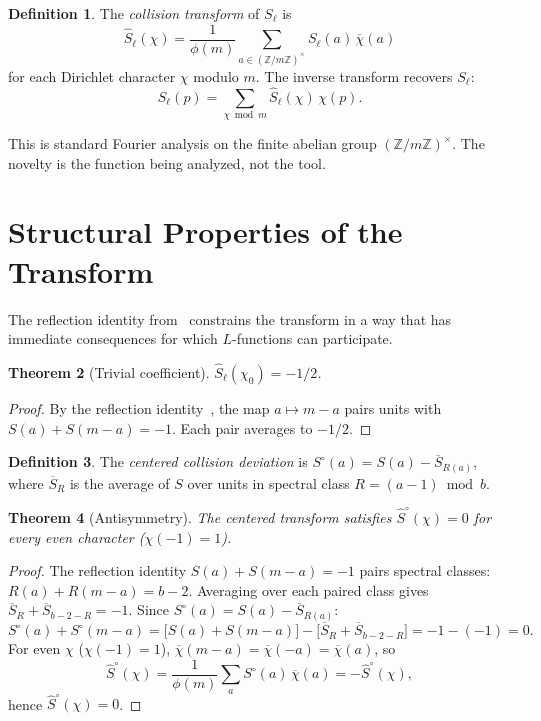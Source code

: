 \documentclass[12pt]{amsart}
\newtheorem{theorem}{Theorem}
\theoremstyle{definition}
\newtheorem{definition}[theorem]{Definition}
\theoremstyle{remark}
\begin{document}
\begin{definition}
The \emph{collision transform} of $S_{\ell}$ is
\[
\hat{S}_{\ell}(\chi) = \frac{1}{\phi(m)}
\sum_{a \in (\mathbb{Z}/m\mathbb{Z})^{\times}}
S_{\ell}(a)\, \overline{\chi}(a)
\]
for each Dirichlet character $\chi$ modulo $m$. The
inverse transform recovers $S_{\ell}$:
\[
S_{\ell}(p) = \sum_{\chi \bmod m}
\hat{S}_{\ell}(\chi)\, \chi(p).
\]
\end{definition}

This is standard Fourier analysis on the finite abelian
group $(\mathbb{Z}/m\mathbb{Z})^{\times}$. The novelty
is the function being analyzed, not the tool.

\section{Structural Properties of the Transform}

The reflection identity from~\cite{paperA} constrains
the transform in a way that has immediate consequences
for which $L$-functions can participate.

\begin{theorem}[Trivial coefficient]\label{thm:trivial}
$\hat{S}_{\ell}(\chi_0) = -1/2$.
\end{theorem}

\begin{proof}
By the reflection identity~\cite{paperA}, the map
$a \mapsto m - a$ pairs units with
$S(a) + S(m{-}a) = -1$. Each pair averages to $-1/2$.
\end{proof}

\begin{definition}
The \emph{centered collision deviation} is
$S^{\circ}(a) = S(a) - \overline{S}_{R(a)}$,
where $\overline{S}_R$ is the average of $S$ over units
in spectral class $R = (a{-}1) \bmod b$.
\end{definition}

\begin{theorem}[Antisymmetry]\label{thm:antisymmetry}
The centered transform satisfies
$\hat{S}^{\circ}(\chi) = 0$ for every even character
($\chi(-1) = 1$).
\end{theorem}

\begin{proof}
The reflection identity $S(a) + S(m{-}a) = -1$ pairs
spectral classes: $R(a) + R(m{-}a) = b - 2$. Averaging
over each paired class gives
$\overline{S}_R + \overline{S}_{b-2-R} = -1$. Since
$S^{\circ}(a) = S(a) - \overline{S}_{R(a)}$:
\[
S^{\circ}(a) + S^{\circ}(m{-}a) =
\bigl[S(a) + S(m{-}a)\bigr]
- \bigl[\overline{S}_R + \overline{S}_{b-2-R}\bigr]
= -1 - (-1) = 0.
\]
For even $\chi$ ($\chi(-1) = 1$),
$\overline{\chi}(m{-}a) = \overline{\chi}(-a)
= \overline{\chi}(a)$, so
\[
\hat{S}^{\circ}(\chi)
= \frac{1}{\phi(m)} \sum_a S^{\circ}(a)\,
\overline{\chi}(a)
= -\hat{S}^{\circ}(\chi),
\]
hence $\hat{S}^{\circ}(\chi) = 0$.
\end{proof}
\end{document}
